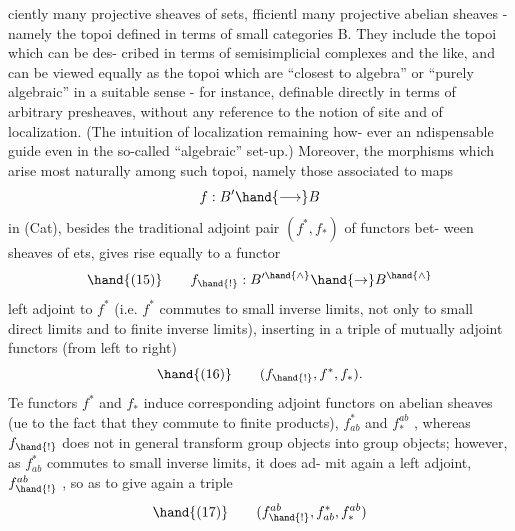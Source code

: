 
ciently many  projective sheaves of sets,  
fficientl many projective abelian sheaves - namely the topoi  defined
in terms of small categories B. They include the topoi which can be des-%
cribed in terms of semisimplicial complexes and the like, and can be
viewed equally as the topoi which are ``closest to algebra'' or ``purely
algebraic'' in a suitable sense - for instance, definable directly in
terms of arbitrary presheaves, without any reference to the notion of
site and of localization. (The intuition of localization remaining how-%
ever an ndispensable guide even in the so-called ``algebraic'' set-up.)
Moreover, the morphisms which arise most naturally among such topoi,
namely those associated to maps 
\[ f : B' \hand{\longrightarrow} B \]
in (Cat), besides the traditional adjoint pair $(f^{*},f_{*})$ of functors bet-%
ween sheaves of ets, gives rise equally to a functor
\[ \hand{(15)} \qquad f_{\hand{!}} : B'^{\hand{\wedge}} \hand{\rightarrow} B^{\hand{\wedge}} \]
left adjoint to $f^{*}$ (i.e. $f^{*}$ commutes to small inverse limits, not only
to small direct limits and to finite inverse limits), inserting in a
triple of mutually adjoint functors (from left to right)
\[ \hand{(16)} \qquad (f_{\hand{!}} , f^{*}, f_{*} ) . \]
Te functors $f^{*}$ and $f_{*}$ induce corresponding adjoint functors on abelian
sheaves (ue to the fact that they commute to finite products), $f^{*}_{ab}$ and
$f^{ab}_{*}$ , whereas $f_{\hand{!}}$ does not in general transform group objects into group
objects; however, as $f^{*}_{ab}$ commutes to small inverse limits, it does ad-%
mit again a left adjoint, $f^{ab}_{\hand{!}}$ , so as to give again a triple
\[ \hand{(17)} \qquad (f^{ab}_{\hand{!}} , f^{*}_{ab} , f^{ab}_{*}) \]
